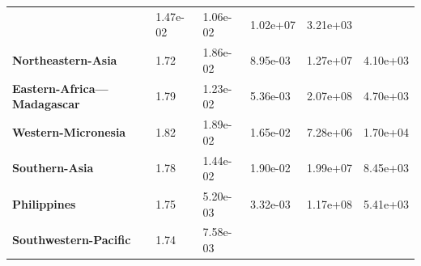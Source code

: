 \begin{table}[H]
{\begin{tabular}{llllll}
                                                                & 1.47e-02
                                                                & 1.06e-02
                                                                & 1.02e+07
                                                                & 3.21e+03
            \\
            \textbf{Northeastern-Asia}                          & 1.72
                                                                & 1.86e-02
                                                                & 8.95e-03
                                                                & 1.27e+07
                                                                & 4.10e+03
            \\
            \textbf{Eastern-Africa---Madagascar}                & 1.79
                                                                & 1.23e-02
                                                                & 5.36e-03
                                                                & 2.07e+08
                                                                & 4.70e+03
            \\
            \textbf{Western-Micronesia}                         & 1.82
                                                                & 1.89e-02
                                                                & 1.65e-02
                                                                & 7.28e+06
                                                                & 1.70e+04
            \\
            \textbf{Southern-Asia}                              & 1.78
                                                                & 1.44e-02
                                                                & 1.90e-02
                                                                & 1.99e+07
                                                                & 8.45e+03
            \\
            \textbf{Philippines}                                & 1.75
                                                                & 5.20e-03
                                                                & 3.32e-03
                                                                & 1.17e+08
                                                                & 5.41e+03
            \\
            \textbf{Southwestern-Pacific}                       & 1.74
                                                                & 7.58e-03

\end{tabular}}
\end{table}
